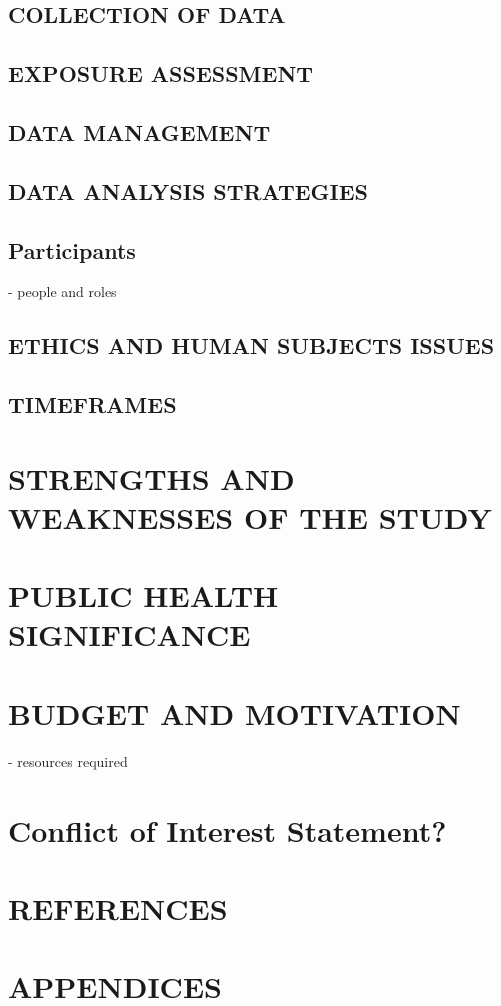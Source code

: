 \documentclass[a4paper, amsfonts, amssymb, amsmath, reprint, showkeys, nofootinbib, twoside]{revtex4-1}
\begin{document}
\subsection{COLLECTION OF DATA}
\subsection{EXPOSURE ASSESSMENT}
\subsection{DATA MANAGEMENT}
\subsection{DATA ANALYSIS STRATEGIES}

\subsection{Participants}
- people and roles

\subsection{ETHICS AND HUMAN SUBJECTS ISSUES}
\subsection{TIMEFRAMES}

\section{STRENGTHS AND WEAKNESSES OF THE STUDY}
\section{PUBLIC HEALTH SIGNIFICANCE}
\section{BUDGET AND MOTIVATION}
- resources required

\section{Conflict of Interest Statement?}

\section{REFERENCES}
\section{APPENDICES}
\end{document}
